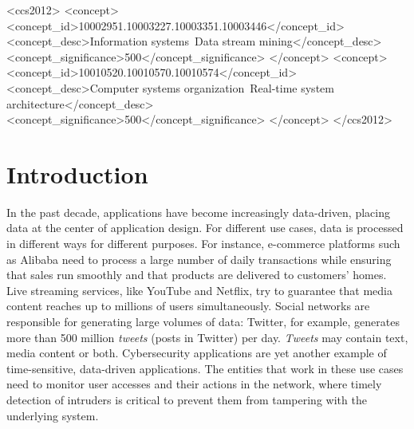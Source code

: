 \documentclass[sigconf]{acmart}
\begin{document}
%
%
\begin{CCSXML}
<ccs2012>
   <concept>
       <concept_id>10002951.10003227.10003351.10003446</concept_id>
       <concept_desc>Information systems~Data stream mining</concept_desc>
       <concept_significance>500</concept_significance>
       </concept>
   <concept>
       <concept_id>10010520.10010570.10010574</concept_id>
       <concept_desc>Computer systems organization~Real-time system architecture</concept_desc>
       <concept_significance>500</concept_significance>
       </concept>
 </ccs2012>
\end{CCSXML}


%


%
\maketitle

\section{Introduction}
In the past decade, applications have become increasingly data-driven, placing data at the center of application design. For different use cases, data is processed in different ways for different purposes. For instance, e-commerce platforms such as Alibaba need to process a large number of daily transactions while ensuring that sales run smoothly and that products are delivered to customers' homes. Live streaming services, like YouTube and Netflix, try to guarantee that media content reaches up to millions of users simultaneously. Social networks are responsible for generating large volumes of data: Twitter, for example, generates more than 500 million \textit{tweets} (posts in Twitter) per day. \textit{Tweets} may contain text, media content or both. Cybersecurity applications are yet another example of time-sensitive, data-driven applications. The entities that work in these use cases need to monitor user accesses and their actions in the network, where timely detection of intruders is critical to prevent them from tampering with the underlying system.
\end{document}
